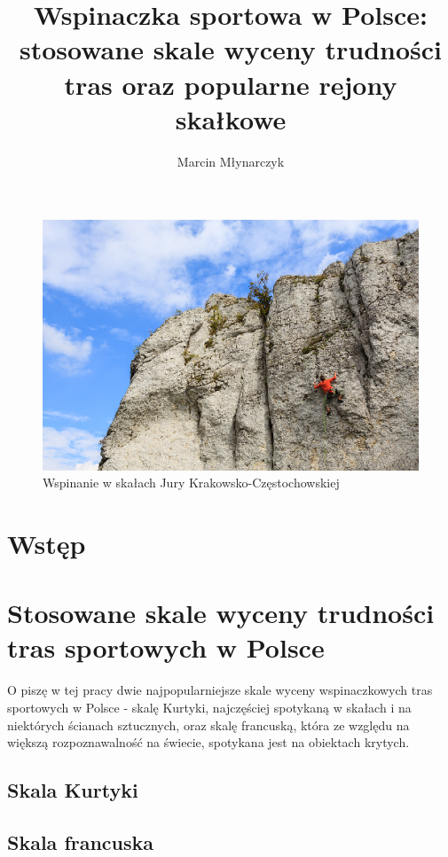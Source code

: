 \documentclass{article}
\title{Wspinaczka sportowa w Polsce: stosowane skale wyceny trudności tras oraz popularne rejony skałkowe}
\author{Marcin Młynarczyk}
\date{\displaydate{date}}
\begin{document}
\maketitle
\tableofcontents

\bigskip

\begin{figure}[!htbp]
	\begin{center}
		\includegraphics[width=0.9\linewidth]{images/wspin-jura.eps}
	\end{center}
	\caption{Wspinanie w skałach Jury Krakowsko-Częstochowskiej \cite{jura-intro}}
	\label{}
\end{figure}

\section{Wstęp}

\section{Stosowane skale wyceny trudności tras sportowych w Polsce}
\lettrine[lines=2]{O}{} piszę w tej pracy dwie najpopularniejsze skale wyceny wspinaczkowych tras sportowych w Polsce - skalę Kurtyki, najczęściej spotykaną w skałach i na niektórych ścianach sztucznych, oraz skalę francuską, która ze względu na większą rozpoznawalność na świecie, spotykana jest na obiektach krytych.

\subsection{Skala Kurtyki}

\subsection{Skala francuska}
\end{document}
